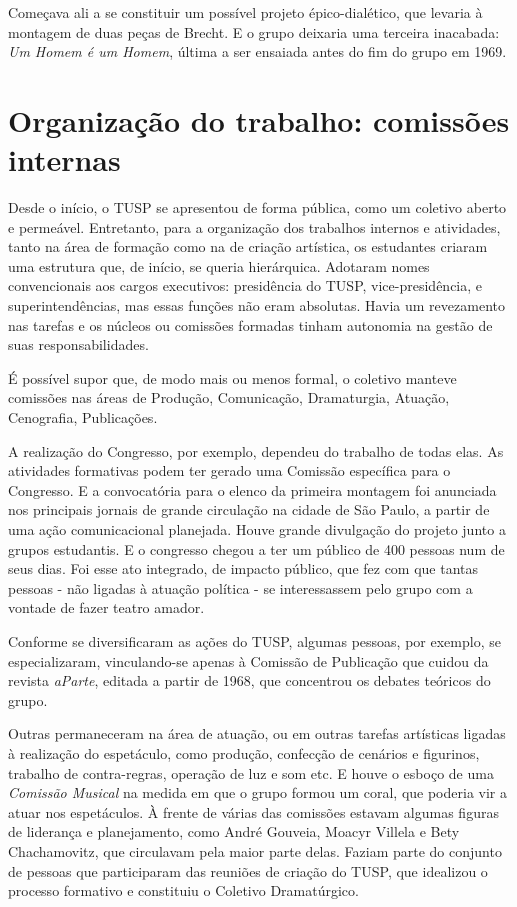 Começava ali a se constituir um possível projeto épico-dialético, que
levaria à montagem de duas peças de Brecht. E o grupo deixaria uma
terceira inacabada: \textit{Um Homem é um Homem}, última a ser ensaiada
antes do fim do grupo em 1969.

\section{Organização do trabalho: comissões internas}

Desde o início, o TUSP se apresentou de forma pública, como um coletivo
aberto e permeável. Entretanto, para a organização dos trabalhos
internos e atividades, tanto na área de formação como na de criação
artística, os estudantes criaram uma estrutura que, de início, se queria
hierárquica. Adotaram nomes convencionais aos cargos executivos:
presidência do TUSP, vice-presidência, e superintendências, mas essas
funções não eram absolutas. Havia um revezamento nas tarefas e os
núcleos ou comissões formadas tinham autonomia na gestão de suas
responsabilidades.

É possível supor que, de modo mais ou menos formal, o coletivo manteve
comissões nas áreas de Produção, Comunicação, Dramaturgia, Atuação,
Cenografia, Publicações.

A realização do Congresso, por exemplo, dependeu do trabalho de todas
elas. As atividades formativas podem ter gerado uma Comissão específica
para o Congresso. E a convocatória para o elenco da primeira montagem
foi anunciada nos principais jornais de grande circulação na cidade de
São Paulo, a partir de uma ação comunicacional planejada. Houve grande
divulgação do projeto junto a grupos estudantis. E o congresso chegou a
ter um público de 400 pessoas num de seus dias. Foi esse ato integrado,
de impacto público, que fez com que tantas pessoas - não ligadas à
atuação política - se interessassem pelo grupo com a vontade de fazer
teatro amador.

Conforme se diversificaram as ações do TUSP, algumas pessoas, por
exemplo, se especializaram, vinculando-se apenas à Comissão de
Publicação que cuidou da revista \textit{aParte}, editada a partir de 1968,
que concentrou os debates teóricos do grupo.

Outras permaneceram na área de atuação, ou em outras tarefas artísticas
ligadas à realização do espetáculo, como produção, confecção de cenários
e figurinos, trabalho de contra-regras, operação de luz e som etc. E
houve o esboço de uma \textit{Comissão Musical} na medida em que o grupo
formou um coral, que poderia vir a atuar nos espetáculos. À frente de
várias das comissões estavam algumas figuras de liderança e
planejamento, como André Gouveia, Moacyr Villela e Bety Chachamovitz,
que circulavam pela maior parte delas. Faziam parte do conjunto de
pessoas que participaram das reuniões de criação do TUSP, que idealizou
o processo formativo e constituiu o Coletivo Dramatúrgico.

